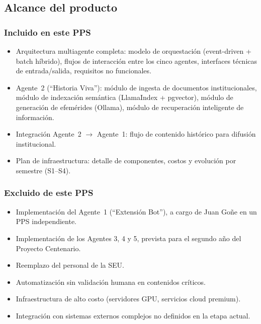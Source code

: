 \documentclass[a4paper, 12pt]{article}
\begin{document}
\subsection{Alcance del producto}

\subsubsection{Incluido en este PPS}

\begin{itemize}
  \item Arquitectura multiagente completa: modelo de orquestaci\'on (event-driven + batch h\'ibrido), flujos de interacci\'on entre los cinco agentes, interfaces t\'ecnicas de entrada/salida, requisitos no funcionales.
  \item Agente~2 (``Historia Viva''): m\'odulo de ingesta de documentos institucionales, m\'odulo de indexaci\'on sem\'antica (LlamaIndex + pgvector), m\'odulo de generaci\'on de efem\'erides (Ollama), m\'odulo de recuperaci\'on inteligente de informaci\'on.
  \item Integraci\'on Agente~2 $\rightarrow$ Agente~1: flujo de contenido hist\'orico para difusi\'on institucional.
  \item Plan de infraestructura: detalle de componentes, costos y evoluci\'on por semestre (S1--S4).
\end{itemize}

\subsubsection{Excluido de este PPS}

\begin{itemize}
  \item Implementaci\'on del Agente~1 (``Extensi\'on Bot''), a cargo de Juan Go\~ne en un PPS independiente.
  \item Implementaci\'on de los Agentes 3, 4 y 5, prevista para el segundo a\~no del Proyecto Centenario.
  \item Reemplazo del personal de la \ac{SEU}.
  \item Automatizaci\'on sin validaci\'on humana en contenidos cr\'iticos.
  \item Infraestructura de alto costo (servidores GPU, servicios cloud premium).
  \item Integraci\'on con sistemas externos complejos no definidos en la etapa actual.
\end{itemize}
\end{document}
